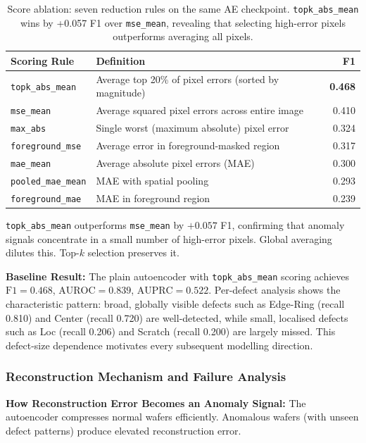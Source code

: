 \documentclass[11pt]{article}
\begin{document}
\begin{table}[H]
\centering
\small
\begin{tabularx}{\linewidth}{l X r}
\toprule
\textbf{Scoring Rule} & \textbf{Definition} & \textbf{F1} \\
\midrule
\texttt{topk\_abs\_mean} & Average top 20\% of pixel errors (sorted by magnitude) & \textbf{0.468} \\
\texttt{mse\_mean} & Average squared pixel errors across entire image & 0.410 \\
\texttt{max\_abs} & Single worst (maximum absolute) pixel error & 0.324 \\
\texttt{foreground\_mse} & Average error in foreground-masked region & 0.317 \\
\texttt{mae\_mean} & Average absolute pixel errors (MAE) & 0.300 \\
\texttt{pooled\_mae\_mean} & MAE with spatial pooling & 0.293 \\
\texttt{foreground\_mae} & MAE in foreground region & 0.239 \\
\bottomrule
\end{tabularx}
\caption{Score ablation: seven reduction rules on the same AE checkpoint. \texttt{topk\_abs\_mean} wins by +0.057 F1 over \texttt{mse\_mean}, revealing that selecting high-error pixels outperforms averaging all pixels.}
\label{tab:score_ablation}
\end{table}

\texttt{topk\_abs\_mean} outperforms \texttt{mse\_mean} by $+0.057$ F1, confirming that anomaly signals concentrate in a small number of high-error pixels. Global averaging dilutes this. Top-$k$ selection preserves it.

\textbf{Baseline Result:} The plain autoencoder with \texttt{topk\_abs\_mean} scoring achieves
$\mathrm{F1}=0.468$, $\mathrm{AUROC}=0.839$, $\mathrm{AUPRC}=0.522$.
Per-defect analysis shows the characteristic pattern: broad, globally visible defects such
as Edge-Ring (recall 0.810) and Center (recall 0.720) are well-detected,
while small, localised defects such as Loc (recall 0.206) and Scratch
(recall 0.200) are largely missed. This defect-size dependence motivates every
subsequent modelling direction.

\subsubsection{Reconstruction Mechanism and Failure Analysis}

\textbf{How Reconstruction Error Becomes an Anomaly Signal:} The autoencoder compresses normal wafers efficiently.
Anomalous wafers (with unseen defect patterns) produce elevated reconstruction error.
\end{document}
